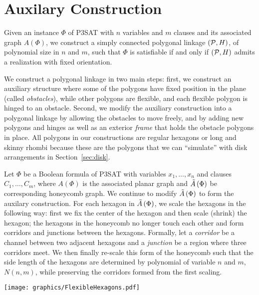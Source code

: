 \section{Auxilary Construction}\label{sec:auxiliaryConstruction}
Given an instance $\Phi$ of P3SAT with $n$ variables and $m$ clauses and its associated graph $A(\Phi)$, we construct a simply connected polygonal linkage $({\cal P},H)$, of polynomial size in $n$ and $m$, such that $\Phi$ is satisfiable if and only if $({\cal P},H)$ admits a realization with fixed orientation. 

We construct a polygonal linkage  in two main steps: first, we construct an auxiliary structure where some of the polygons have fixed position in the plane (called \emph{obstacles}), while other polygons are flexible, and each flexible polygon is hinged to an obstacle. 
Second, we modify the auxiliary construction into a polygonal linkage by allowing the obstacles to move freely, and by adding new polygons and hinges as well as an exterior \emph{frame} that holds the obstacle polygons in place.
All polygons in our constructions are regular hexagons or long and skinny rhombi because these are the polygons that we can ``simulate'' with disk arrangements in Section~\ref{sec:disk}.

Let $\Phi$ be a Boolean formula of P3SAT with variables $x_1,\ldots , x_n$ and clauses $C_1,\ldots ,C_m$, where $A(\Phi)$ is the associated planar graph and $\tilde{A}\left( \Phi \right)$ be corresponding honeycomb graph.
We continue to modify $\tilde{A}\left( \Phi \right)$ to form the auxilary construction.   
For each hexagon in $\tilde{A}\left( \Phi \right)$, we scale the hexagons in the following way: first we fix the center of the hexagon and then scale (shrink) the hexagon; the hexagons in the honeycomb no longer touch each other and form corridors and junctions between the hexagons. 
Formally, let a \textit{corridor} be a channel between two adjacent hexagons and a \textit{junction} be a region where three corridors meet.
We then finally re-scale this form of the honeycomb such that the side length of the hexagons are determined by polynomial of variable $n$ and $m$, $N(n,m)$, while preserving the corridors formed from the first scaling.\newline

\begin{minipage}{\linewidth}
\begin{center}
\texttt{[image: graphics/FlexibleHexagons.pdf]}
\label{fig:HoneycombFlixible.pdf}
\end{center}
\end{minipage}

